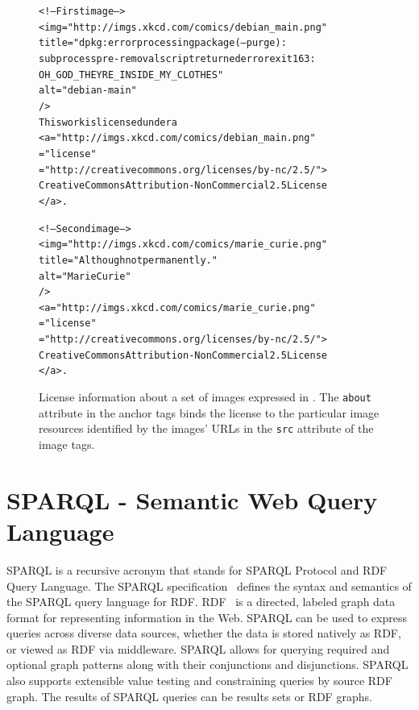 \documentclass[12pt]{article}
\newenvironment{code}[1]
{\begin{lrbox}{\inverbatim}\begin{minipage}{13.5cm}\begin{alltt}{#1}}
{\end{alltt}\end{minipage}\end{lrbox}\colorbox{lightgray}{\usebox{\inverbatim}}}
\begin{document}
\begin{figure}[htbp!]
\begin{center}
{\footnotesize
\begin{code}
<!-- First image -->
<img ="http://imgs.xkcd.com/comics/debian_main.png"
     title="dpkg: error processing package (--purge):
         subprocess pre-removal script returned error exit 163:
         OH_GOD_THEYRE_INSIDE_MY_CLOTHES" 
     alt="debian-main"
/>
This work is licensed under a
<a ="http://imgs.xkcd.com/comics/debian_main.png"
   ="license" 
   ="http://creativecommons.org/licenses/by-nc/2.5/">
  Creative Commons Attribution-NonCommercial 2.5 License
</a>.

<!-- Second image -->
<img ="http://imgs.xkcd.com/comics/marie_curie.png"
     title="Although not permanently."
     alt="Marie Curie"
/>
<a ="http://imgs.xkcd.com/comics/marie_curie.png"
   ="license"
   ="http://creativecommons.org/licenses/by-nc/2.5/">
  Creative Commons Attribution-NonCommercial 2.5 License
</a>.
\end{code}}
  \caption[License information about a set of images expressed in RDFa.]{License information about a set of images expressed in . The \texttt{about} attribute in the anchor tags binds the license to the particular image resources identified by the images' URLs in the \texttt{src} attribute of the image tags.}
  \label{code:rdfa-license}
  \end{center}  
\end{figure}

\section{SPARQL - Semantic Web Query Language}
SPARQL is a recursive acronym that stands for SPARQL Protocol and RDF Query Language. The SPARQL specification~\cite{sparql} defines the syntax and semantics of the SPARQL query language for RDF. RDF~\cite{RDF} is a directed, labeled graph data format for representing information in the Web. SPARQL can be used to express queries across diverse data sources, whether the data is stored natively as RDF, or viewed as RDF via middleware. SPARQL allows for querying required and optional graph patterns along with their conjunctions and disjunctions. SPARQL also supports extensible value testing and constraining queries by source RDF graph. The results of SPARQL queries can be results sets or RDF graphs.
\end{document}
